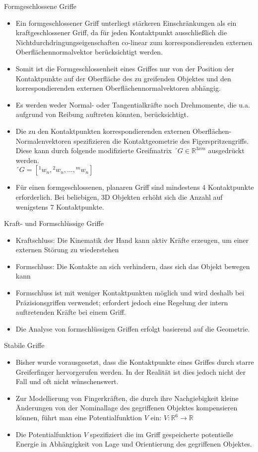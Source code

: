 \documentclass[paper=a4, fontsize=11pt]{scrartcl} %
\numberwithin{equation}{section} %
\numberwithin{figure}{section} %
\numberwithin{table}{section} %
\begin{document}
Formgeschlossene Griffe
\begin{itemize}
\item Ein formgeschlossener Griff unterliegt stärkeren Einschränkungen als ein kraftgeschlossener Griff, da für jeden Kontaktpunkt ausschließlich die Nichtdurchdringungseigenschaften co-linear zum korrespondierenden externen Oberflächennormalvektor berücksichtigt werden.
\item Somit ist die Formgeschlossenheit eines Griffes nur von der Position der Kontaktpunkte auf der Oberfläche des zu greifenden Objektes und den korrespondierenden externen Oberflächennormalvektoren abhängig.
\item Es werden weder Normal- oder Tangentialkräfte noch Drehmomente, die u.a. aufgrund von Reibung auftreten könnten, berücksichtigt.
\item Die zu den Kontaktpunkten korrespondierenden externen Oberflächen-Normalenvektoren spezifizieren die Kontaktgeometrie des Figerspritzengriffs. Diese kann durch folgende modifizierte Greifmatrix $´G \in \mathbb{R}^{3xm}$ ausgedrückt werden.\\ 
$´G = [{}^1w_n, {}^2w_n,...,{}^mw_n]$
\item Für einen formgeschlossenen, planaren Griff sind mindestens 4 Kontaktpunkte erforderlich. Bei beliebigen, 3D Objekten erhöht sich die Anzahl auf wenigstens 7 Kontaktpunkte.
\end{itemize}

Kraft- und Formschlüssige Griffe
\begin{itemize}
\item Kraftschluss: Die Kinematik der Hand kann aktiv Kräfte erzeugen, um einer externen Störung zu wiederstehen
\item Formschluss: Die Kontakte an sich verhindern, dass sich das Objekt bewegen kann
\item Formschluss ist mit weniger Kontaktpunkten möglich und wird deshalb bei Präzisionsgriffen verwendet; erfordert jedoch eine Regelung der intern auftretenden Kräfte bei einem Griff.
\item Die Analyse von formschlüssigen Griffen erfolgt basierend auf die Geometrie.
\end{itemize}

Stabile Griffe
\begin{itemize}
\item Bisher wurde vorausgesetzt, dass die Kontaktpunkte eines Griffes durch starre Greiferfinger hervorgerufen werden. In der Realität ist dies jedoch nicht der Fall und oft nicht wünschenswert.
\item Zur Modellierung von Fingerkräften, die durch ihre Nachgiebigkeit kleine Änderungen von der Nominallage des gegriffenen Objektes kompensieren können, führt man eine Potentialfunktion $V$ ein: $V: \mathbb{R}^6 \rightarrow \mathbb{R}$
\item Die Potentialfunktion $V$ spezifiziert die im Griff gespeicherte potentielle Energie in Abhängigkeit von Lage und Orientierung des gegriffenen Objektes.
\end{itemize}
\end{document}
